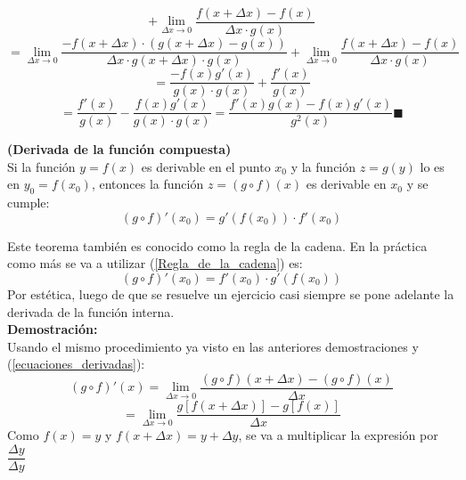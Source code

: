 \documentclass[10pt,twoside]{SelfArx} %
\begin{document}
\begin{enumerate}
\begin{equation}
	+		\lim\limits_{\Delta x\rightarrow 0}\dfrac{f(x+\Delta x)-f(x)}{\Delta x\cdot g(x)}
	\end{equation}
	\begin{equation}
		=\lim\limits_{\Delta x\rightarrow 0}\dfrac{-f(x+\Delta x)\cdot(g(x+\Delta x)-g(x))}{\Delta x\cdot g(x+\Delta x)\cdot g(x)}
		+		\lim\limits_{\Delta x\rightarrow 0}\dfrac{f(x+\Delta x)-f(x)}{\Delta x\cdot g(x)}
	\end{equation}
	\begin{equation}
			=\dfrac{-f(x)g'(x)}{ g(x)\cdot g(x)}
			+	\dfrac{f'(x)}{g(x)}
	\end{equation}
	\begin{equation}
=		\dfrac{f'(x)}{g(x)}-\dfrac{f(x)g'(x)}{ g(x)\cdot g(x)}=\dfrac{f'(x)g(x)-f(x)g'(x)}{g^{2}(x)}
	 \blacksquare 
	\end{equation}
\end{enumerate}
\begin{teorema}
	\textbf{(Derivada de la función compuesta)}\\
	Si la función $ y=f(x) $ es derivable  en el punto $ x_{0} $ y la función $ z=g(y) $ lo es en $ y_{0}=f(x_{0}) $, entonces la función $ z=(g\circ f)(x) $ es derivable en $ x_{0} $ y se cumple:
	\begin{equation}
	(g\circ f)'(x_{0})=g'(f(x_{0}))\cdot f'(x_{0}) \label{Regla_de_la_cadena}
	\end{equation}
\end{teorema}
Este teorema también es conocido como la regla de la cadena. En la práctica como más se va a utilizar (\ref{Regla_de_la_cadena}) es:
\begin{equation}
 (g\circ f)'(x_{0})=f'(x_{0})\cdot g'(f(x_{0}))  
\end{equation}
Por estética, luego de que se resuelve un ejercicio casi siempre se pone adelante la derivada de la función interna.\\
\textbf{Demostración:}\\
Usando el mismo procedimiento ya visto en las anteriores demostraciones y (\ref{ecuaciones_derivadas}):\\
\begin{equation}
(g\circ f)'(x)=\lim\limits_{\Delta x\rightarrow0}\dfrac{(g\circ f)(x+\Delta x)-(g\circ f)(x)}{\Delta x}
\end{equation}
\begin{equation}
=\lim\limits_{\Delta x\rightarrow0}\dfrac{g [f(x+\Delta x)]-g[f(x)]}{\Delta x}
\end{equation}
Como $ f(x)=y $ y $ f(x+\Delta x)=y+\Delta y $, se va a multiplicar la expresión por $ \dfrac{\Delta y}{\Delta y} $
\end{document}
